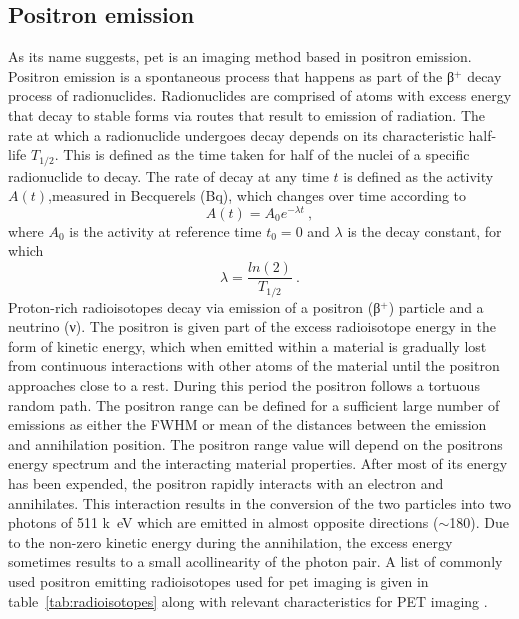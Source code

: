 \subsection{Positron emission}
As its name suggests, \gls{pet} is an imaging method based in positron emission. Positron emission is a spontaneous process that happens as part of the β$^{+}$ decay process of radionuclides. 
Radionuclides are comprised of atoms with excess energy that decay to stable forms via routes that result to emission of radiation.
The rate at which a radionuclide undergoes decay depends on its characteristic half-life $T_{1/2}$. This is defined as the time taken for half of the nuclei of a specific radionuclide to decay. The rate of decay at any time $t$ is defined as the activity $A(t)$,measured in Becquerels (Bq), which changes over time according to
\begin{equation} \label{Decay}
A(t) = A_0 e^{-\lambda t} \ ,
\end{equation}
where $A_0$ is the activity at reference time $t_0=0$ and $\lambda$ is the decay constant, for which 
\begin{equation} \label{Decayconstant}
\lambda = \frac{ln(2)}{T_{1/2}} \ .
\end{equation}
%
Proton-rich radioisotopes decay via emission of a positron (β$^{+}$) particle and a neutrino (ν). The positron is given part of the excess radioisotope energy in the form of kinetic energy, which when emitted within a material is gradually lost from continuous interactions with other atoms of the material until the positron approaches close to a rest. During this period the positron follows a tortuous random path. The positron range can be defined for a sufficient large number of emissions as either the FWHM or mean of the distances between the emission and annihilation position. The positron range value will depend on the positrons energy spectrum and the interacting material properties. After most of its energy has been expended, the positron rapidly interacts with an electron and annihilates. This interaction results in the conversion of the two particles into two photons of 511 \si{k\electronvolt} which are emitted in almost opposite directions ($\sim$180\degree). Due to the non-zero kinetic energy during the annihilation, the excess energy sometimes results to a small acollinearity of the photon pair.
%
A list of commonly used positron emitting radioisotopes used for \gls{pet} imaging is given in table~\ref{tab:radioisotopes} along with relevant characteristics for PET imaging \cite{Conti2016}.


